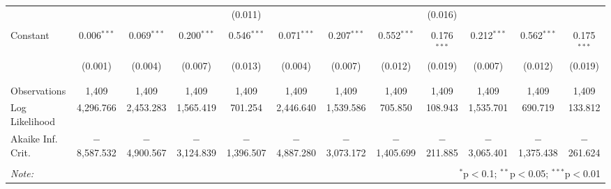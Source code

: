 \begin{tabular}{@{\extracolsep{5pt}}lccccccccccc}
  &  &  &  & (0.011) &  &  &  & (0.016) &  &  &  \\
  & & & & & & & & & & & \\
 Constant & 0.006$^{***}$ & 0.069$^{***}$ & 0.200$^{***}$ & 0.546$^{***}$ & 0.071$^{***}$ & 0.207$^{***}$ & 0.552$^{***}$ & 0.176$^{***}$ & 0.212$^{***}$ & 0.562$^{***}$ & 0.175$^{***}$ \\
  & (0.001) & (0.004) & (0.007) & (0.013) & (0.004) & (0.007) & (0.012) & (0.019) & (0.007) & (0.012) & (0.019) \\
  & & & & & & & & & & & \\
\hline \\[-1.8ex]
Observations & 1,409 & 1,409 & 1,409 & 1,409 & 1,409 & 1,409 & 1,409 & 1,409 & 1,409 & 1,409 & 1,409 \\
Log Likelihood & 4,296.766 & 2,453.283 & 1,565.419 & 701.254 & 2,446.640 & 1,539.586 & 705.850 & 108.943 & 1,535.701 & 690.719 & 133.812 \\
Akaike Inf. Crit. & $-$8,587.532 & $-$4,900.567 & $-$3,124.839 & $-$1,396.507 & $-$4,887.280 & $-$3,073.172 & $-$1,405.699 & $-$211.885 & $-$3,065.401 & $-$1,375.438 & $-$261.624 \\
\hline
\hline \\[-1.8ex]
\textit{Note:}  & \multicolumn{11}{r}{$^{*}$p$<$0.1; $^{**}$p$<$0.05; $^{***}$p$<$0.01} \\
\end{tabular}

